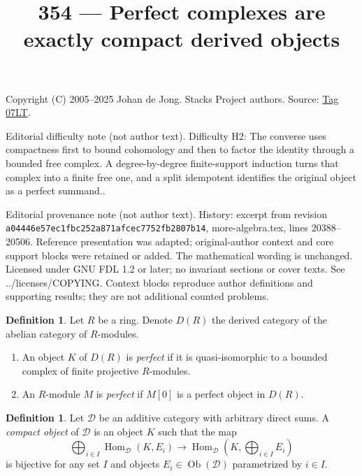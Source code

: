 \documentclass{amsart}
\theoremstyle{plain}
\theoremstyle{definition}
\newtheorem{definition}[subsection]{Definition}
\theoremstyle{remark}
\numberwithin{equation}{subsection}
\def\Hom{\mathop{\mathrm{Hom}}\nolimits}
\def\Ob{\mathop{\mathrm{Ob}}\nolimits}
\begin{document}
\title[Stacks Project, Tag 07LT]{354 --- Perfect complexes are exactly compact derived objects}
\maketitle
\noindent Copyright (C) 2005--2025 Johan de Jong. Stacks Project authors. Source: \href{https://stacks.math.columbia.edu/tag/07LT}{Tag 07LT}.

\noindent Editorial difficulty note (not author text). Difficulty H2: The converse uses compactness first to bound cohomology and then to factor the identity through a bounded free complex. A degree-by-degree finite-support induction turns that complex into a finite free one, and a split idempotent identifies the original object as a perfect summand..

\noindent Editorial provenance note (not author text). History: excerpt from revision \texttt{a0444\allowbreak 6e57e\allowbreak c1fbc\allowbreak 252a8\allowbreak 71afc\allowbreak ec775\allowbreak 2fb28\allowbreak 07b14}, more-algebra.tex, lines 20388--20506. Reference presentation was adapted; original-author context and core support blocks were retained or added. The mathematical wording is unchanged. Licensed under GNU FDL 1.2 or later; no invariant sections or cover texts. See ../licenses/COPYING. Context blocks reproduce author definitions and supporting results; they are not additional counted problems.

\begin{definition}
\label{definition-perfect}
Let $R$ be a ring. Denote $D(R)$ the derived category of the abelian
category of $R$-modules.
\begin{enumerate}
\item An object $K$ of $D(R)$ is {\it perfect} if it is quasi-isomorphic
to a bounded complex of finite projective $R$-modules.
\item An $R$-module $M$ is {\it perfect} if $M[0]$ is a perfect object
in $D(R)$.
\end{enumerate}
\end{definition}

\begin{definition}
\label{derived-definition-compact-object}
Let $\mathcal{D}$ be an additive category with arbitrary direct
sums. A {\it compact object} of $\mathcal{D}$ is an object $K$
such that the map
$$
\bigoplus\nolimits_{i \in I} \Hom_{\mathcal{D}}(K, E_i)
\longrightarrow
\Hom_{\mathcal{D}}(K, \bigoplus\nolimits_{i \in I} E_i)
$$
is bijective for any set $I$ and objects
$E_i \in \Ob(\mathcal{D})$ parametrized by $i \in I$.
\end{definition}
\end{document}
